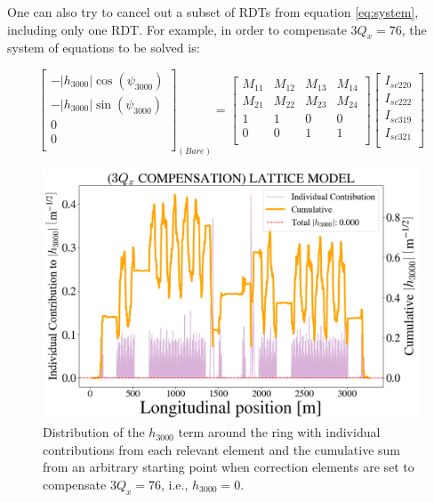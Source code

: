 One can also try to cancel out a subset of RDTs from equation \ref{eq:system}, including only one RDT. For example, in order to compensate $3 Q_x=76$, the system of equations to be solved is:

\begin{equation}
    \begin{bmatrix}
        -|{h_{3000}}|  \cos (\psi_{3000})\\
        -|{h_{3000}}|  \sin (\psi_{3000})\\
        0\\
        0\\
      \end{bmatrix}_{(Bare)}
    =
    \begin{bmatrix}
        M_{11} & M_{12} & M_{13} & M_{14} \\
        M_{21} & M_{22} & M_{23} & M_{24} \\
        1 & 1 & 0 & 0 \\
        0 & 0 & 1 & 1 \\
    \end{bmatrix}
    \begin{bmatrix}
        I_{sc220} \\
        I_{sc222} \\
        I_{sc319} \\
        I_{sc321} \\
      \end{bmatrix}
    \label{eq:system1}
\end{equation}

\begin{figure}[H]
    \centering
    \includegraphics[width=\columnwidth]{chapter4/h3000_3qxcomp.png}
    \caption{Distribution of the $h_{3000}$ term around the ring with individual contributions from each relevant element and the cumulative sum from an arbitrary starting point when correction elements are set to compensate $3Q_x=76$, i.e., $h_{3000}=0$.}
    \label{fig:h3000_3qxcomp}
\end{figure}

